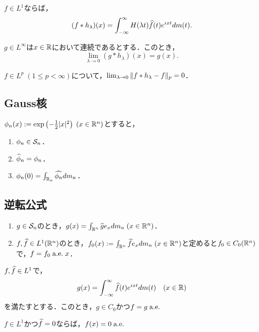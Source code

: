 \documentclass[uplatex,dvipdfmx]{jsreport}
\begin{document}
\begin{proposition}
    $f\in L^1$ならば，
    \[(f*h_\lambda)(x)=\int^\infty_{-\infty}H(\lambda t)\wh{f}(t)e^{ixt}dm(t).\]
\end{proposition}

\begin{proposition}
    $g\in L^\infty$は$x\in\R$において連続であるとする．このとき，
    \[\lim_{\lambda\to 0}(g*h_\lambda)(x)=g(x).\]
\end{proposition}

\begin{proposition}
    $f\in L^p\;(1\le p<\infty)$について，$\lim_{\lambda\to0}\norm{f*h_\lambda-f}_p=0$．
\end{proposition}

\subsection{Gauss核}

\begin{lemma}
    $\phi_n(x):=\exp\paren{-\frac{1}{2}\abs{x}^2}\;(x\in\R^n)$とすると，
    \begin{enumerate}
        \item $\phi_n\in\S_n$．
        \item $\wh{\phi}_n=\phi_n$．
        \item $\phi_n(0)=\int_{\R_n}\wh{\phi_n}dm_n$．
    \end{enumerate}
\end{lemma}

\subsection{逆転公式}

\begin{theorem}\mbox{}
    \begin{enumerate}
        \item $g\in\S_n$のとき，$g(x)=\int_{\R^n}\wh{g}e_xdm_n\;(x\in\R^n)$．
        \item $f,\wh{f}\in L^1(\R^n)$のとき，$f_0(x):=\int_{\R^n}\wh{f}e_xdm_n\;(x\in\R^n)$と定めると$f_0\in C_0(\R^n)$で，$f=f_0\;\ae x$．
    \end{enumerate}
    $f,\wh{f}\in L^1$で，
    \[g(x)=\int^\infty_{-\infty}\wh{f}(t)e^{ixt}dm(t)\quad(x\in\R)\]
    を満たすとする．このとき，$g\in C_0$かつ$f=g\;\ae$
\end{theorem}

\begin{theorem}
    $f\in L^1$かつ$\wh{f}=0$ならば，$f(x)=0\;\ae$
\end{theorem}
\end{document}
